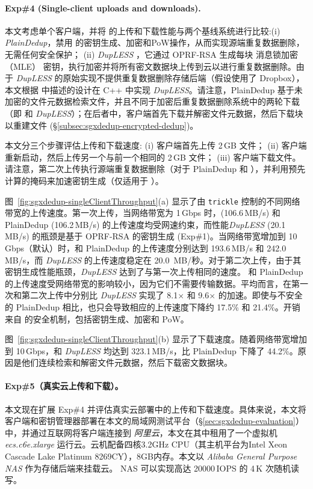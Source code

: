 \paragraph*{Exp\#4 (Single-client uploads and downloads).} 本文考虑单个客户端，并将 \sysnameS 的上传和下载性能与两个基线系统进行比较:(i) \textit{ PlainDedup}，禁用 \sysnameS 的密钥生成、加密和PoW操作，从而实现源端重复数据删除，无需任何安全保护； (ii) \textit{ {\em DupLESS}} \cite{bellare2013DupLESS}，它通过 OPRF-RSA 生成每块 消息锁加密（MLE） 密钥，执行加密并将所有密文数据块上传到云以进行重复数据删除。由于 {\em DupLESS} 的原始实现不提供重复数据删除存储后端（假设使用了 Dropbox），本文根据 \cite{bellare2013DupLESS} 中描述的设计在 C++ 中实现 {\em DupLESS}。请注意，PlainDedup 基于未加密的文件元数据检索文件，并且不同于加密后重复数据删除系统中的两轮下载（即 \sysnameS 和 {\em DupLESS}）；在后者中，客户端首先下载并解密文件元数据，然后下载块以重建文件 (\S\ref{subsec:sgxdedup-encrypted-dedup})。

本文分三个步骤评估上传和下载速度: (i) 客户端首先上传 2\,GB 文件； (ii) 客户端重新启动，然后上传另一个与前一个相同的 2\,GB 文件； (iii) 客户端下载文件。请注意，第二次上传执行源端重复数据删除（对于 PlainDedup 和 \sysnameS），并利用预先计算的掩码来加速密钥生成（仅适用于 \sysnameS）。

图~\ref{fig:sgxdedup-singleClientThroughput}(a) 显示了由 {\tt trickle} \cite{eriksen05} 控制的不同网络带宽的上传速度。第一次上传，当网络带宽为 1\,Gbps 时，\sysnameS (106.6\,MB/s) 和 PlainDedup (106.2\,MB/s) 的上传速度均受网速约束，而性能{\em DupLESS} (20.1\,MB/s) 的瓶颈是基于 OPRF-RSA 的密钥生成 (Exp\#1)。当网络带宽增加到 10\,Gbps（默认）时，\sysnameS 和 PlainDedup 的上传速度分别达到 193.6\,MB/s 和 242.0\,MB/s，而 {\em DupLESS} 的上传速度稳定在 20.0\, MB/秒。对于第二次上传，由于其密钥生成性能瓶颈，{\em DupLESS} 达到了与第一次上传相同的速度。 \sysnameS 和 PlainDedup 的上传速度受网络带宽的影响较小，因为它们不需要传输数据。平均而言，\sysnameS 在第一次和第二次上传中分别比 {\em DupLESS} 实现了 8.1$\times$ 和 9.6$\times$ 的加速。即使与不安全的 PlainDedup 相比，\sysnameS 也只会导致相应的上传速度下降约 17.5\% 和 21.4\%。开销来自 \sysnameS 的安全机制，包括密钥生成、加密和 PoW。

图~\ref{fig:sgxdedup-singleClientThroughput}(b) 显示了下载速度。随着网络带宽增加到 10\,Gbps，\sysnameS 和 {\em DupLESS} 均达到 323.1\,MB/s，比 PlainDedup 下降了 44.2\%。原因是他们连续检索和解密文件元数据，然后下载密文数据块。

\paragraph*{Exp\#5（真实云上传和下载）。} 本文现在扩展 Exp\#4 并评估真实云部署中的上传和下载速度。具体来说，本文将客户端和密钥管理器部署在本文的局域网测试平台（\S\ref{sec:sgxdedup-evaluation}）中，并通过互联网将客户端连接到\textit{ 阿里云}，本文在其中租用了一个虚拟机\textit{ ecs.c6e.xlarge} 运行云。云机配备四核3.2GHz CPU（其主机平台为Intel Xeon Cascade Lake Platinum 8269CY），8GB内存。本文以 \textit{ Alibaba General Purpose NAS} 作为存储后端来挂载云。 NAS 可以实现高达 20000\,IOPS 的 4\,K 次随机读写。

